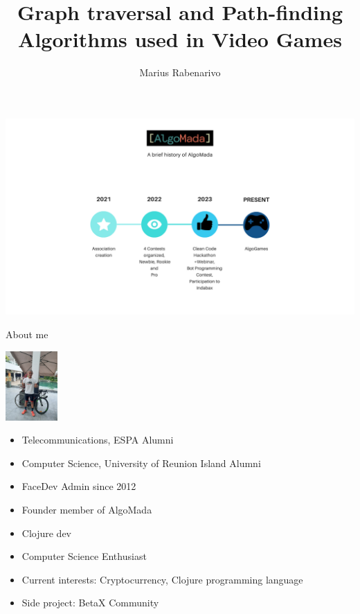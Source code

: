 \documentclass[ignorenonframetext,]{beamer}
\title{Graph traversal and Path-finding Algorithms used in Video Games}
\author{Marius Rabenarivo}
\date{}
\providecommand{\tightlist}{%
  \setlength{\itemsep}{0pt}\setlength{\parskip}{0pt}}
\begin{document}
\frame{\titlepage}

\begin{frame}

\includegraphics{AlgoMada.png}

\end{frame}

\begin{frame}{About me}
\protect\hypertarget{about-me}{}

\includegraphics[width=\textwidth,height=1.04167in]{marius.jpg}

\begin{itemize}
\tightlist
\item
  Telecommunications, ESPA Alumni
\item
  Computer Science, University of Reunion Island Alumni
\item
  FaceDev Admin since 2012
\item
  Founder member of AlgoMada
\item
  Clojure dev
\item
  Computer Science Enthusiast
\item
  Current interests: Cryptocurrency, Clojure programming language
\item
  Side project: BetaX Community
\end{itemize}

\end{frame}
\end{document}
